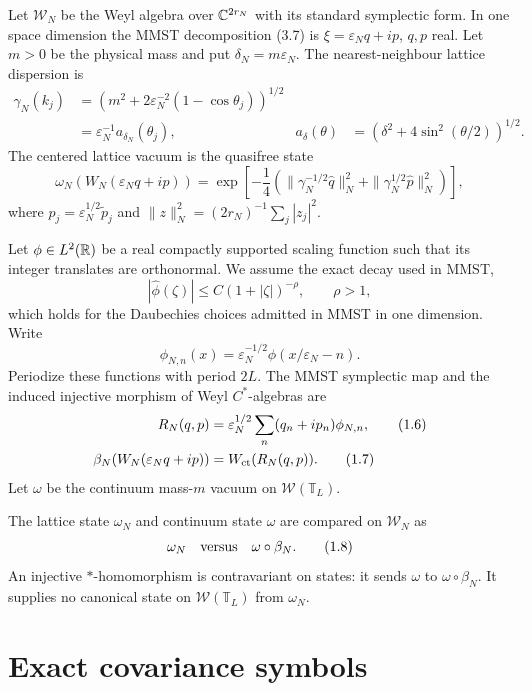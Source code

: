 \documentclass[11pt,a4paper]{article}
\newcommand{\T}{\mathbb T}
\newcommand{\W}{\mathcal W}
\newcommand{\eps}{\varepsilon}
\begin{document}
Let $\W_N$ be the Weyl algebra over $\mathbb C^{2r_N}$ with its standard symplectic
form.  In one space dimension the MMST decomposition (3.7) is
$\xi=\eps_Nq+ip$, $q,p$ real.  Let $m>0$ be the physical mass and put
$\delta_N=m\eps_N$.  The nearest-neighbour lattice dispersion is
\begin{align}
 \gamma_N(k_j)
 &=\left(m^2+2\eps_N^{-2}(1-\cos\theta_j)\right)^{1/2}\\
 &=\eps_N^{-1}a_{\delta_N}(\theta_j),
 &a_\delta(\theta)&=\left(\delta^2+4\sin^2(\theta/2)\right)^{1/2}. \tag{1.3}
\end{align}
The centered lattice vacuum is the quasifree state
\[
 \omega_N(W_N(\eps_Nq+ip))
 =\exp\left[-\frac14\left(
  \|\gamma_N^{-1/2}\widehat q\|_{N}^{2}
 +\|\gamma_N^{1/2}\widehat p\|_{N}^{2}\right)\right],          \tag{1.4}
\]
where $\widehat p_j=\eps_N^{1/2}\widetilde p_j$ and
$\|z\|_N^2=(2r_N)^{-1}\sum_j|z_j|^2$.

Let $\phi\in L^2(\mathbb R)$ be a real compactly supported scaling function such that
its integer translates are orthonormal.  We assume the exact decay used in MMST,
\[
 |\widehat\phi(\zeta)|\leq C(1+|\zeta|)^{-\rho},\qquad \rho>1,   \tag{1.5}
\]
which holds for the Daubechies choices admitted in MMST in one dimension.  Write
\[
\phi_{N,n}(x)=\eps_N^{-1/2}\phi(x/\eps_N-n).
\]
Periodize these functions with period $2L$.  The MMST symplectic map and the
induced injective morphism of Weyl $C^*$-algebras are
\begin{align}
 R_N(q,p)&=\eps_N^{1/2}\sum_n(q_n+ip_n)\phi_{N,n},               \tag{1.6}\\
 \beta_N(W_N(\eps_Nq+ip))&=W_{\rm ct}(R_N(q,p)).                 \tag{1.7}
\end{align}
Let $\omega$ be the continuum mass-$m$ vacuum on $\W(\T_L)$.

\begin{definition}\label{def:comparison}
The lattice state $\omega_N$ and continuum state $\omega$ are compared on
$\W_N$ as
\[
 \omega_N\quad\hbox{versus}\quad \omega\circ\beta_N.           \tag{1.8}
\]
An injective $*$-homomorphism is contravariant on states: it sends $\omega$ to
$\omega\circ\beta_N$.  It supplies no canonical state on $\W(\T_L)$ from
$\omega_N$.
\end{definition}

\section{Exact covariance symbols}\label{sec:symbols}
\end{document}
